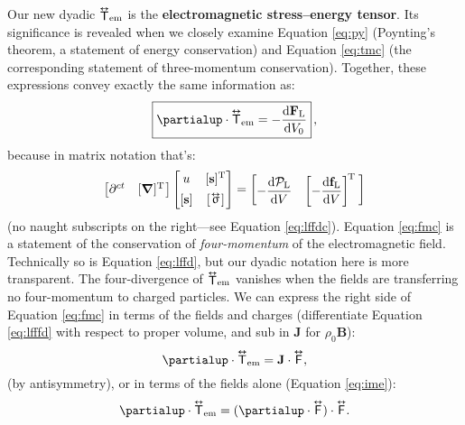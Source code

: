 \documentclass[12pt]{article}
\renewcommand{\vv}[1]{\mathbf{#1}}
\newcommand{\dd}[1]{\mathrm{d}#1}
\newcommand{\del}{\boldsymbol{\nabla}}
\newcommand{\tightoverset}[2]{%
  \mathop{#2}\limits^{\vbox to -.5ex{\kern-0.75ex\hbox{$#1$}\vss}}}
\newcommand{\inlinedy}[1]{\tightoverset{\text{\tiny$\bm\leftrightarrow$}}{#1}}
\newcommand{\capdy}[1]{ \overset{ \text{\tiny$\bm\leftrightarrow$} }{\vphantom{\text{\small{A}}}\smash{#1}} }
\begin{document}
Our new dyadic ${\inlinedy{\mathsf{T}}} _{\textrm{em}}$ is the \textbf{electromagnetic stress--energy tensor}. Its significance is revealed when we closely examine Equation \ref{eq:py} (Poynting's theorem, a statement of energy conservation) and Equation \ref{eq:tmc} (the corresponding statement of three-momentum conservation). Together, these expressions convey exactly the same information as:
\begin{equation}\label{eq:fmc}
\boxed{ \partialup \cdot \capdy{\mathsf{T}}_{\textrm{em}} = - \dfrac{\dd \vv F_{\mathrm{L}}}{\dd V_0} } \, ,
\end{equation}
because in matrix notation that's:
\begin{equation}\label{eq:fmcm}
\begin{bmatrix}
\partial^{ct} & [ \del ]^{\mathrm{T}} \mkern1mu
\end{bmatrix}
\begin{bmatrix}
u & [\vv s]^{\mathrm{T}} \\[1ex]
[\vv s] & [ \, \mkern-2mu \inlinedy{\upsigma} \mkern1mu ]
\end{bmatrix}
=
\begin{bmatrix}
- \dfrac{\dd \mathcal{P}_{\textrm{L}}}{\dd V} & \left[ - \dfrac{\dd \vv f_{\mathrm{L}}}{\dd V} \right] ^{\mkern-2mu \mathrm{T} \; }
\end{bmatrix}
\end{equation}
(no naught subscripts on the right---see Equation \ref{eq:lffdc}). Equation \ref{eq:fmc} is a statement of the conservation of \emph{four-momentum} of the electromagnetic field. Technically so is Equation \ref{eq:lffd}, but our dyadic notation here is more transparent. The four-divergence of ${\inlinedy{\mathsf{T}}}_{\textrm{em}}$ vanishes when the fields are transferring no four-momentum to charged particles. We can express the right side of Equation \ref{eq:fmc} in terms of the fields and charges (differentiate Equation \ref{eq:lfffd} with respect to proper volume, and sub in $\vv J$ for $\rho_0 \vv B$):
\begin{equation*}
\partialup \cdot \capdy{\mathsf{T}}_{\textrm{em}} = \vv J \cdot \capdy{\mathsf{F}} ,
\end{equation*}
(by antisymmetry), or in terms of the fields alone (Equation \ref{eq:ime}):
\begin{equation*}
\partialup \cdot \capdy{\mathsf{T}}_{\textrm{em}} = ( \partialup \cdot \capdy{\mathsf{F}} ) \cdot \capdy{\mathsf{F}} .
\end{equation*}
\end{document}
